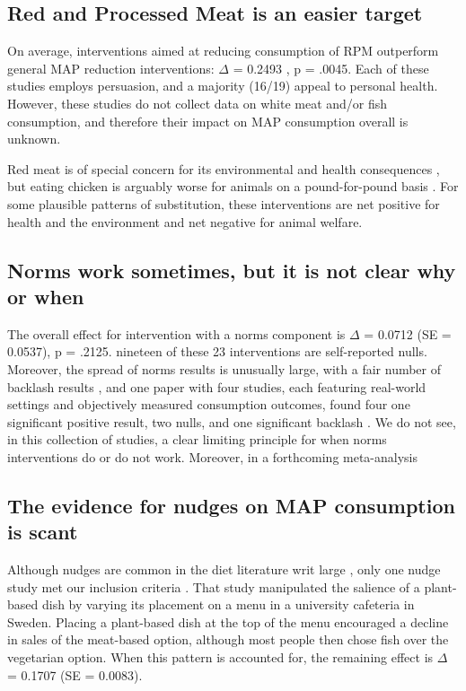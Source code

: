 \documentclass[sn-nature,pdflatex]{sn-jnl}
\begin{document}
\subsection{Red and Processed Meat is an easier target}\label{sec2.4}

On average, interventions aimed at reducing consumption of RPM
outperform general MAP reduction interventions: \(\Delta\) = 0.2493
, p = .0045. Each of these studies employs
persuasion, and a majority (16/19) appeal to personal health. However,
these studies do not collect data on white meat and/or fish consumption,
and therefore their impact on MAP consumption overall is unknown.

Red meat is of special concern for its environmental and health
consequences \citep{grummon2023}, but eating chicken is arguably worse
for animals on a pound-for-pound basis \citep{mathur2022ethical}. For
some plausible patterns of substitution, these interventions are net
positive for health and the environment and net negative for animal
welfare.

\subsection{Norms work sometimes, but it is not clear why or
when}\label{sec2.5}

The overall effect for intervention with a norms component is \(\Delta\)
= 0.0712 (SE = 0.0537), p = .2125. nineteen of these 23 interventions
are self-reported nulls. Moreover, the spread of norms results is
unusually large, with a fair number of backlash results
\citep{mattson2020, griesoph2021}, and one paper with four studies, each
featuring real-world settings and objectively measured consumption
outcomes, found four one significant positive result, two nulls, and one
significant backlash \citep{sparkman2020}. We do not see, in this
collection of studies, a clear limiting principle for when norms
interventions do or do not work. Moreover, in a forthcoming
meta-analysis

\subsection{The evidence for nudges on MAP consumption is
scant}\label{sec2.6}

Although nudges are common in the diet literature writ large
\citep{olafsson2024, cadario2020, szaszi2018}, only one nudge study met
our inclusion criteria \citep{andersson2021}. That study manipulated the
salience of a plant-based dish by varying its placement on a menu in a
university cafeteria in Sweden. Placing a plant-based dish at the top of
the menu encouraged a decline in sales of the meat-based option,
although most people then chose fish over the vegetarian option. When
this pattern is accounted for, the remaining effect is \(\Delta\) =
0.1707 (SE = 0.0083).
\end{document}

